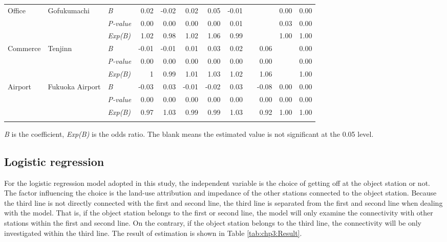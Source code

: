 \begin{sidewaystable}[htbp]
\begin{tabular}{p{7em}p{5em}p{5em}<{\centering}rrrrrrrrr}
		\multirow{3}[0]{7em}{Office} & \multirow{3}[0]{5em}{Gofukumachi} & \textsl{B} & 0.02 & -0.02 & 0.02 & 0.05 & -0.01 & & & 0.00 & 0.00 \\
		& & \textsl{P-value} & 0.00 & 0.00 & 0.00 & 0.00 & 0.01 & & & 0.03 & 0.00 \\
		& & \textsl{Exp(B)} & 1.02 & 0.98 & 1.02 & 1.06 & 0.99 & & & 1.00 & 1.00 \\
		\midrule
		
		\multirow{3}[0]{7em}{Commerce} & \multirow{3}[0]{5em}{Tenjinn} & \textsl{B} & -0.01 & -0.01 & 0.01  & 0.03  & 0.02  & & 0.06 & & 0.00 \\
		& & \textsl{P-value} & 0.00 & 0.00 & 0.00 & 0.00  & 0.00 & & 0.00 & & 0.00 \\
		& & \textsl{Exp(B)} & 1 & 0.99 & 1.01 & 1.03 & 1.02 & & 1.06 & & 1.00 \\
		\midrule
		
		\multirow{3}[0]{7em}{Airport} & \multirow{3}[0]{5em}{Fukuoka Airport} & \textsl{B} & -0.03 & 0.03 & -0.01 & -0.02 & 0.03 & & -0.08 & 0.00 & 0.00 \\
		& & \textsl{P-value} & 0.00 & 0.00 & 0.00 & 0.00 & 0.00 & & 0.00 & 0.00 & 0.00 \\
		& & \textsl{Exp(B)} & 0.97 & 1.03 & 0.99 & 0.99 & 1.03 & & 0.92 & 1.00 & 1.00 \\
		\Xhline{1.5pt}
		
	\end{tabular}%
	\begin{description}
		\label{note:tab:chp3:Result}
		\item[*Note:] \textsl{B} is the coefficient, \textsl{Exp(B)} is the odds ratio. The blank means the estimated value is not significant at the 0.05 level.
	\end{description}
	
\end{sidewaystable}%

\subsection{Logistic regression}
%
For the logistic regression model adopted in this study, the independent variable is the choice of getting off at the object station or not. The factor influencing the choice is the land-use attribution and impedance of the other stations connected to the object station. Because the third line is not directly connected with the first and second line, the third line is separated from the first and second line when dealing with the model. That is, if the object station belongs to the first or second line, the model will only examine the connectivity with other stations within the first and second line. On the contrary, if the object station belongs to the third line, the connectivity will be only investigated within the third line. The result of estimation is shown in Table \ref{tab:chp3:Result}.

